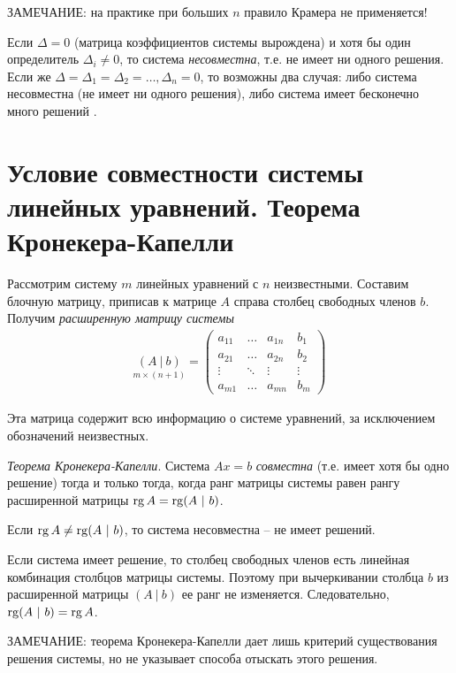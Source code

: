 \documentclass[%
	11pt,
	a4paper,
	utf8,
		]{article}
\begin{document}
ЗАМЕЧАНИЕ: на практике при больших $ n $ правило Крамера не применяется!

Если $ \Delta = 0 $ (матрица коэффициентов системы вырождена) и хотя бы один определитель $ \Delta_i \neq 0 $, то система \emph{несовместна}, т.е. не имеет ни одного решения. Если же $ \Delta = \Delta_1 = \Delta_2 = \ldots, \Delta_n = 0 $, то возможны два случая: либо система несовместна (не имеет ни одного решения), либо система имеет бесконечно много решений \cite[]{bortakovskiy:2005}.

\section{Условие совместности системы линейных уравнений. Теорема Кронекера-Капелли}

Рассмотрим систему $ m $ линейных уравнений с $ n $ неизвестными. Составим блочную матрицу, приписав к матрице $ A $ справа столбец свободных членов $ b $. Получим \emph{расширенную матрицу системы}
\begin{align*}
	\underset{m \times (n + 1)}{(  A \ | \ b )} =
	  \begin{pmatrix}
	  	  a_{11} & \dots & a_{1n} &  b_1\\
	  	  a_{21} & \dots & a_{2n}  & b_2 \\
	  	  \vdots  & \ddots & \vdots & \vdots \\
	  	  a_{m1} & \dots & a_{mn} & b_m
	  \end{pmatrix}
\end{align*}

Эта матрица содержит всю информацию о системе уравнений, за исключением обозначений неизвестных.

\emph{Теорема Кронекера-Капелли}. Система $ A x = b $ \emph{совместна} (т.е. имеет хотя бы одно решение) тогда и только тогда, когда ранг матрицы системы равен рангу расширенной матрицы $ \operatorname*{rg} A = \operatorname*{rg} (A \ | \ b) $.

Если $ \operatorname*{rg} A \neq \operatorname*{rg} (A \ | \ b) $, то система несовместна -- не имеет решений.

Если система имеет решение, то столбец свободных членов есть линейная комбинация столбцов матрицы системы. Поэтому при вычеркивании столбца $ b $ из расширенной матрицы $ (A \ | \ b) $ ее ранг не изменяется. Следовательно, $ \operatorname*{rg} (A \ | \ b) = \operatorname*{rg} A $.

ЗАМЕЧАНИЕ: теорема Кронекера-Капелли дает лишь критерий существования решения системы, но не указывает способа отыскать этого решения.
\end{document}
